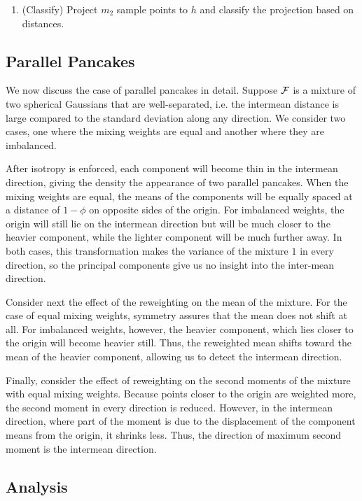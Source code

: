 \documentclass{book}
\numberwithin{exercise}{chapter}
\begin{document}
{\begin{center}
{{\begin{minipage}{4.5in}
\begin{tt}
\begin{enumerate}
\item (Classify) Project $m_2$ sample
points to $h$ and classify the projection based on distances.
\end{enumerate}
\end{tt}
\end{minipage}
}}
\end{center}

\subsection{Parallel Pancakes}\label{sec:pancakes}
We now discuss the case of parallel pancakes in detail.
Suppose ${\mathcal{F}}$ is a mixture of two spherical Gaussians that are
well-separated, i.e. the intermean distance is large compared to the
standard deviation along any direction.  We consider two cases, one
where the mixing weights are equal and another where they are
imbalanced.

After isotropy is enforced, each component will become thin in the
intermean direction, giving the density the appearance of two
parallel pancakes.  When the mixing weights are equal, the means of
the components will be equally spaced at a distance of $1 -
\phi$ on opposite sides of the origin.  For imbalanced weights, the
origin will still lie on the intermean direction but will be much
closer to the heavier component, while the lighter component will be
much further away.  In both cases, this transformation makes the
variance of the mixture $1$ in every direction, so the principal
components give us no insight into the inter-mean direction.

Consider next the effect of the reweighting on the mean of the
mixture.  For the case of equal mixing weights, symmetry assures that
the mean does not shift at all.  For imbalanced weights, however, the
heavier component, which lies closer to the origin will become heavier
still.  Thus, the reweighted mean shifts toward the mean of the
heavier component, allowing us to detect the intermean direction.

Finally, consider the effect of reweighting on the second moments of
the mixture with equal mixing weights.  Because points closer to the
origin are weighted more, the second moment in every direction is
reduced.  However, in the intermean direction, where part of the
moment is due to the displacement of the component means from the
origin, it shrinks less.  Thus, the direction of maximum second
moment is the intermean direction.

\subsection{Analysis}\label{sec:isopca-analysis}

}
\end{document}
